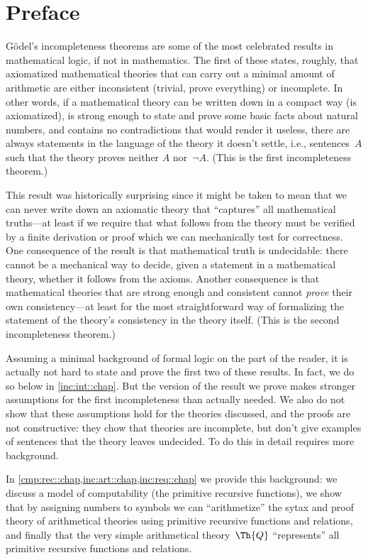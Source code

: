 
\chapter{Preface}

G\"odel's incompleteness theorems are some of the most celebrated
results in mathematical logic, if not in mathematics. The first of
these states, roughly, that axiomatized mathematical theories that can
carry out a minimal amount of arithmetic are either inconsistent
(trivial, prove everything) or incomplete. In other words, if a
mathematical theory can be written down in a compact way (is
axiomatized), is strong enough to state and prove some basic facts
about natural numbers, and contains no contradictions that would
render it useless, there are always statements in the language of the
theory it doesn't settle, i.e., sentences~$A$ such that the theory
proves neither $A$ nor~$\lnot A$. (This is the first incompleteness
theorem.)

This result was historically surprising since it might be
taken to mean that we can never write down an axiomatic theory that
``captures'' all mathematical truths---at least if we require that
what follows from the theory must be verified by a finite derivation
or proof which we can mechanically test for correctness. One
consequence of the result is that mathematical truth is undecidable:
there cannot be a mechanical way to decide, given a statement in a
mathematical theory, whether it follows from the axioms. Another
consequence is that mathematical theories that are strong enough and
consistent cannot \emph{prove} their own consistency---at least for
the most straightforward way of formalizing the statement of the
theory's consistency in the theory itself. (This is the second
incompleteness theorem.)

Assuming a minimal background of formal logic on the part of the
reader, it is actually not hard to state and prove the first two of
these results. In fact, we do so below in \cref{inc:int::chap}. But
the version of the result we prove makes stronger assumptions for the
first incompleteness than actually needed. We also do not show that
these assumptions hold for the theories discussed, and the proofs are
not constructive: they chow that theories are incomplete, but don't
give examples of sentences that the theory leaves undecided. To do
this in detail requires more background.

In \cref{cmp:rec::chap,inc:art::chap,inc:req::chap} we provide this
background: we discuss a model of computability (the primitive
recursive functions), we show that by assigning numbers to symbols we
can ``arithmetize'' the sytax and proof theory of arithmetical
theories using primitive recursive functions and relations, and
finally that the very simple arithmetical theory~$\Th{Q}$
``represents'' all primitive recursive functions and relations.

